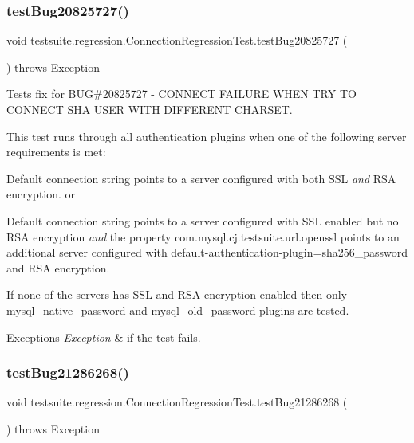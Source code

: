 \subsubsection{\texorpdfstring{test\+Bug20825727()}{testBug20825727()}}
{\footnotesize\ttfamily void testsuite.\+regression.\+Connection\+Regression\+Test.\+test\+Bug20825727 (\begin{DoxyParamCaption}{ }\end{DoxyParamCaption}) throws Exception}

Tests fix for B\+UG\#20825727 -\/ C\+O\+N\+N\+E\+CT F\+A\+I\+L\+U\+RE W\+H\+EN T\+RY TO C\+O\+N\+N\+E\+CT S\+HA U\+S\+ER W\+I\+TH D\+I\+F\+F\+E\+R\+E\+NT C\+H\+A\+R\+S\+ET.

This test runs through all authentication plugins when one of the following server requirements is met\+:
\begin{DoxyEnumerate}
\item Default connection string points to a server configured with both S\+SL {\itshape and} R\+SA encryption. or
\item Default connection string points to a server configured with S\+SL enabled but no R\+SA encryption {\itshape and} the property com.\+mysql.\+cj.\+testsuite.\+url.\+openssl points to an additional server configured with default-\/authentication-\/plugin=sha256\+\_\+password and R\+SA encryption.
\end{DoxyEnumerate}

If none of the servers has S\+SL and R\+SA encryption enabled then only \textquotesingle{}mysql\+\_\+native\+\_\+password\textquotesingle{} and \textquotesingle{}mysql\+\_\+old\+\_\+password\textquotesingle{} plugins are tested.


\begin{DoxyExceptions}{Exceptions}
{\em Exception} & if the test fails. \\
\hline
\end{DoxyExceptions}
\mbox{\label{classtestsuite_1_1regression_1_1_connection_regression_test_ab5a03581f2da17e71bf3d9449439c888}} 
\subsubsection{\texorpdfstring{test\+Bug21286268()}{testBug21286268()}}
{\footnotesize\ttfamily void testsuite.\+regression.\+Connection\+Regression\+Test.\+test\+Bug21286268 (\begin{DoxyParamCaption}{ }\end{DoxyParamCaption}) throws Exception}

